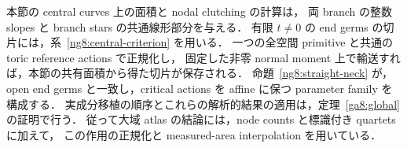 本節の central curves 上の面積と nodal clutching の計算は，
両 branch の整数 slopes と branch stars の共通線形部分を与える．
有限 $t\ne0$ の end germs の切片には，系~\ref{ng8:central-criterion} を用いる．
一つの全空間 primitive と共通の toric reference actions で正規化し，
固定した非零 normal moment 上で輸送すれば，本節の共有面積から得た切片が保存される．
命題~\ref{ng8:straight-neck} が，open end germs と一致し，critical actions を affine に保つ
parameter family を構成する．
実成分移植の順序とこれらの解析的結果の適用は，定理~\ref{ga8:global} の証明で行う．
従って大域 atlas の結論には，node counts と標識付き quartets に加えて，
この作用の正規化と measured-area interpolation を用いている．
